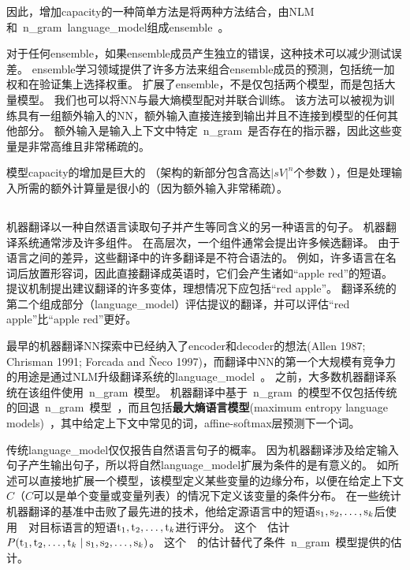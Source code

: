 因此，增加\gls{capacity}的一种简单方法是将两种方法结合，由\gls{NLM}和~\gls{n_gram}~\gls{language_model}组成\gls{ensemble}~\citep{BenDucVin01-small,Bengio-nnlm2003-small}。

对于任何\gls{ensemble}，如果\gls{ensemble}成员产生独立的错误，这种技术可以减少测试误差。
\gls{ensemble}学习领域提供了许多方法来组合\gls{ensemble}成员的预测，包括统一加权和在验证集上选择权重。
\citet{Mikolov-Interspeech-2011} 扩展了\gls{ensemble}，不是仅包括两个模型，而是包括大量模型。
我们也可以将\gls{NN}与最大熵模型配对并联合训练\citep{Mikolov-ASRU-2011}。
该方法可以被视为训练具有一组额外输入的\gls{NN}，额外输入直接连接到输出并且不连接到模型的任何其他部分。
额外输入是输入上下文中特定~\gls{n_gram}~是否存在的指示器，因此这些变量是非常高维且非常稀疏的。

模型\gls{capacity}的增加是巨大的 （架构的新部分包含高达$| sV |^n$个参数 ），但是处理输入所需的额外计算量是很小的（因为额外输入非常稀疏）。

\subsection{}
\label{sec:neural_machine_translation}

机器翻译以一种自然语言读取句子并产生等同含义的另一种语言的句子。
机器翻译系统通常涉及许多组件。
在高层次，一个组件通常会提出许多候选翻译。
由于语言之间的差异，这些翻译中的许多翻译是不符合语法的。
例如，许多语言在名词后放置形容词，因此直接翻译成英语时，它们会产生诸如``apple red''的短语。
提议机制提出建议翻译的许多变体，理想情况下应包括``red apple''。
翻译系统的第二个组成部分（\gls{language_model}）评估提议的翻译，并可以评估``red apple''比``apple red''更好。


最早的机器翻译\gls{NN}探索中已经纳入了\gls{encoder}和\gls{decoder}的想法(Allen 1987; Chrisman 1991; Forcada
and Ñeco 1997)，而翻译中\gls{NN}的第一个大规模有竞争力的用途是通过\gls{NLM}升级翻译系统的\gls{language_model}~\citep{Schwenk-et-al-IWSLT2006,Schwenk-2010}。
之前，大多数机器翻译系统在该组件使用~\gls{n_gram}~模型。
机器翻译中基于~\gls{n_gram}~的模型不仅包括传统的回退~\gls{n_gram}~模型~\citep{Jelinek+Mercer80,Katz87,Chen+Goodman99}，而且包括\textbf{最大熵语言模型}(maximum entropy language models)~\citep{MaxEnt96}，其中给定上下文中常见的词，affine-softmax层预测下一个词。

传统\gls{language_model}仅仅报告自然语言句子的概率。
因为机器翻译涉及给定输入句子产生输出句子，所以将自然\gls{language_model}扩展为条件的是有意义的。
如所述可以直接地扩展一个模型，该模型定义某些变量的边缘分布，以便在给定上下文$C$（$C$可以是单个变量或变量列表）的情况下定义该变量的条件分布。
\citet{Devlin-et-al-ACL2014}在一些统计机器翻译的基准中击败了最先进的技术，他给定源语言中的短语$\mathrm{s}_1, \mathrm{s}_2,\ldots, \mathrm{s}_k$后使用~~对目标语言的短语$\mathrm{t}_1, \mathrm{t}_2,\ldots, \mathrm{t}_k$进行评分。
这个~~估计$P(\mathrm{t}_1, \mathrm{t}_2,\ldots, \mathrm{t}_k \mid \mathrm{s}_1, \mathrm{s}_2,\ldots, \mathrm{s}_k)$。
这个~~的估计替代了条件~\gls{n_gram}~模型提供的估计。

